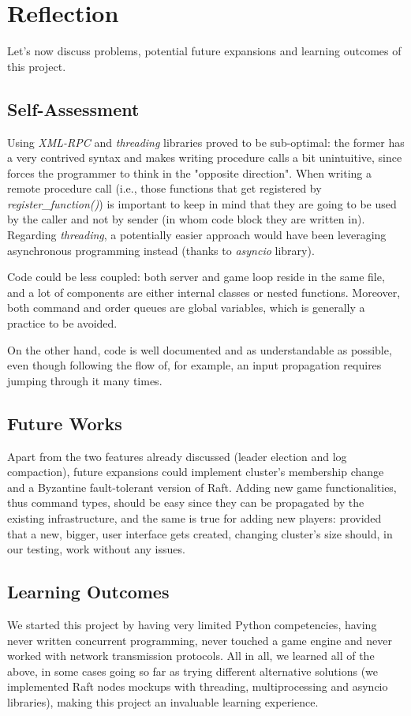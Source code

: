 \section{Reflection}

Let's now discuss problems, potential future expansions and learning outcomes of this project.

\subsection{Self-Assessment}

Using \textit{XML-RPC} and \textit{threading} libraries proved to be sub-optimal: the former has a very contrived syntax and makes writing procedure calls a bit unintuitive, since forces the programmer to think in the "opposite direction". When writing a remote procedure call (i.e., those functions that get registered by \textit{register\_function()}) is important to keep in mind that they are going to be used by the caller and not by sender (in whom code block they are written in). Regarding \textit{threading}, a potentially easier approach would have been leveraging asynchronous programming instead (thanks to \textit{asyncio} library).

Code could be less coupled: both server and game loop reside in the same file, and a lot of components are either internal classes or nested functions. Moreover, both command and order queues are global variables, which is generally a practice to be avoided.  

On the other hand, code is well documented and as understandable as possible, even though following the flow of, for example, an input propagation requires jumping through it many times.

\subsection{Future Works}

Apart from the two features already discussed (leader election and log compaction), future expansions could implement cluster's membership change and a Byzantine fault-tolerant version of Raft. Adding new game functionalities, thus command types, should be easy since they can be propagated by the existing infrastructure, and the same is true for adding new players: provided that a new, bigger, user interface gets created, changing cluster's size should, in our testing, work without any issues.  

\subsection{Learning Outcomes}

We started this project by having very limited Python competencies, having never written concurrent programming, never touched a game engine and never worked with network transmission protocols. All in all, we learned all of the above, in some cases going so far as trying different alternative solutions (we implemented Raft nodes mockups with threading, multiprocessing and asyncio libraries), making this project an invaluable learning experience. 